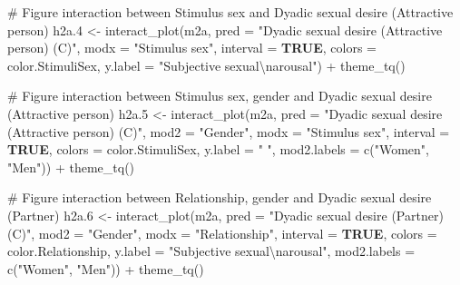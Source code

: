 \documentclass[
  bookmarksnumbered]{article}
\newenvironment{Shaded}{\begin{snugshade}}{\end{snugshade}}
\newcommand{\AttributeTok}[1]{\textcolor[rgb]{0.80,0.80,0.80}{#1}}
\newcommand{\CommentTok}[1]{\textcolor[rgb]{0.50,0.62,0.50}{#1}}
\newcommand{\ConstantTok}[1]{\textcolor[rgb]{0.86,0.64,0.64}{\textbf{#1}}}
\newcommand{\FloatTok}[1]{\textcolor[rgb]{0.75,0.75,0.82}{#1}}
\newcommand{\FunctionTok}[1]{\textcolor[rgb]{0.94,0.94,0.56}{#1}}
\newcommand{\NormalTok}[1]{\textcolor[rgb]{0.80,0.80,0.80}{#1}}
\newcommand{\OtherTok}[1]{\textcolor[rgb]{0.94,0.94,0.56}{#1}}
\newcommand{\SpecialCharTok}[1]{\textcolor[rgb]{0.86,0.64,0.64}{#1}}
\newcommand{\StringTok}[1]{\textcolor[rgb]{0.80,0.58,0.58}{#1}}
\begin{document}
\begin{Shaded}
\begin{Highlighting}[]
\CommentTok{\# Figure interaction between Stimulus sex and Dyadic sexual desire (Attractive person)}
\NormalTok{h2a}\FloatTok{.4} \OtherTok{\textless{}{-}} \FunctionTok{interact\_plot}\NormalTok{(m2a, }\AttributeTok{pred =} \StringTok{"Dyadic sexual desire (Attractive person) (C)"}\NormalTok{, }
              \AttributeTok{modx =} \StringTok{"Stimulus sex"}\NormalTok{,}
              \AttributeTok{interval =} \ConstantTok{TRUE}\NormalTok{,}
              \AttributeTok{colors =}\NormalTok{ color.StimuliSex,}
              \AttributeTok{y.label =} \StringTok{"Subjective sexual}\SpecialCharTok{\textbackslash{}n}\StringTok{arousal"}\NormalTok{) }\SpecialCharTok{+}
  \FunctionTok{theme\_tq}\NormalTok{()}

\CommentTok{\# Figure interaction between Stimulus sex, gender and Dyadic sexual desire (Attractive person)}
\NormalTok{h2a}\FloatTok{.5} \OtherTok{\textless{}{-}} \FunctionTok{interact\_plot}\NormalTok{(m2a, }\AttributeTok{pred =} \StringTok{"Dyadic sexual desire (Attractive person) (C)"}\NormalTok{, }
              \AttributeTok{mod2 =} \StringTok{"Gender"}\NormalTok{,}
              \AttributeTok{modx =} \StringTok{"Stimulus sex"}\NormalTok{,}
              \AttributeTok{interval =} \ConstantTok{TRUE}\NormalTok{,}
              \AttributeTok{colors =}\NormalTok{ color.StimuliSex,}
              \AttributeTok{y.label =} \StringTok{" "}\NormalTok{,}
              \AttributeTok{mod2.labels =} \FunctionTok{c}\NormalTok{(}\StringTok{"Women"}\NormalTok{, }\StringTok{"Men"}\NormalTok{)) }\SpecialCharTok{+}
  \FunctionTok{theme\_tq}\NormalTok{()}

\CommentTok{\# Figure interaction between Relationship, gender and Dyadic sexual desire (Partner)}
\NormalTok{h2a}\FloatTok{.6} \OtherTok{\textless{}{-}} \FunctionTok{interact\_plot}\NormalTok{(m2a, }\AttributeTok{pred =} \StringTok{"Dyadic sexual desire (Partner) (C)"}\NormalTok{, }
              \AttributeTok{mod2 =} \StringTok{"Gender"}\NormalTok{,}
              \AttributeTok{modx =} \StringTok{"Relationship"}\NormalTok{,}
              \AttributeTok{interval =} \ConstantTok{TRUE}\NormalTok{,}
              \AttributeTok{colors =}\NormalTok{ color.Relationship,}
              \AttributeTok{y.label =} \StringTok{"Subjective sexual}\SpecialCharTok{\textbackslash{}n}\StringTok{arousal"}\NormalTok{,}
              \AttributeTok{mod2.labels =} \FunctionTok{c}\NormalTok{(}\StringTok{"Women"}\NormalTok{, }\StringTok{"Men"}\NormalTok{)) }\SpecialCharTok{+}
  \FunctionTok{theme\_tq}\NormalTok{()}


\end{Highlighting}
\end{Shaded}
\end{document}

